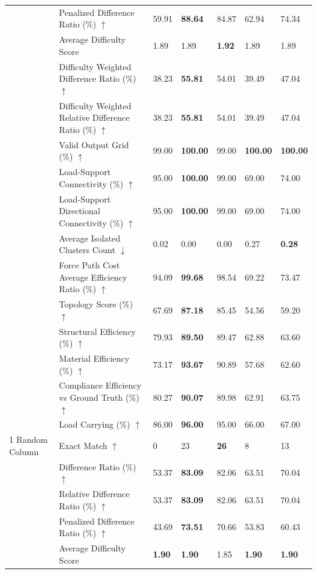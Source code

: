 \begin{table}[!h]
{\begin{tabular}{lllllll}
 & Penalized Difference Ratio (\%) $\uparrow$ & 59.91 & \textbf{88.64} & 84.87 & 62.94 & 74.34 \\
 & Average Difficulty Score & 1.89 & 1.89 & \textbf{1.92} & 1.89 & 1.89 \\
 & Difficulty Weighted Difference Ratio (\%) $\uparrow$ & 38.23 & \textbf{55.81} & 54.01 & 39.49 & 47.04 \\
 & Difficulty Weighted Relative Difference Ratio (\%) $\uparrow$ & 38.23 & \textbf{55.81} & 54.01 & 39.49 & 47.04 \\
 & Valid Output Grid (\%) $\uparrow$ & 99.00 & \textbf{100.00} & 99.00 & \textbf{100.00} & \textbf{100.00} \\
 & Load-Support Connectivity (\%) $\uparrow$ & 95.00 & \textbf{100.00} & 99.00 & 69.00 & 74.00 \\
 & Load-Support Directional Connectivity (\%) $\uparrow$ & 95.00 & \textbf{100.00} & 99.00 & 69.00 & 74.00 \\
 & Average Isolated Clusters Count $\downarrow$ & 0.02 & 0.00 & 0.00 & 0.27 & \textbf{0.28} \\
 & Force Path Cost Average Efficiency Ratio (\%) $\uparrow$ & 94.09 & \textbf{99.68} & 98.54 & 69.22 & 73.47 \\
 & Topology Score (\%) $\uparrow$ & 67.69 & \textbf{87.18} & 85.45 & 54.56 & 59.20 \\
 & Structural Efficiency (\%) $\uparrow$ & 79.93 & \textbf{89.50} & 89.47 & 62.88 & 63.60 \\
 & Material Efficiency (\%) $\uparrow$ & 73.17 & \textbf{93.67} & 90.89 & 57.68 & 62.60 \\
 & Compliance Efficiency vs Ground Truth (\%) $\uparrow$ & 80.27 & \textbf{90.07} & 89.98 & 62.91 & 63.75 \\
 & Load Carrying (\%) $\uparrow$ & 86.00 & \textbf{96.00} & 95.00 & 66.00 & 67.00 \\
1 Random Column & Exact Match $\uparrow$ & 0 & 23 & \textbf{26} & 8 & 13 \\
 & Difference Ratio (\%) $\uparrow$ & 53.37 & \textbf{83.09} & 82.06 & 63.51 & 70.04 \\
 & Relative Difference Ratio (\%) $\uparrow$ & 53.37 & \textbf{83.09} & 82.06 & 63.51 & 70.04 \\
 & Penalized Difference Ratio (\%) $\uparrow$ & 43.69 & \textbf{73.51} & 70.66 & 53.83 & 60.43 \\
 & Average Difficulty Score & \textbf{1.90} & \textbf{1.90} & 1.85 & \textbf{1.90} & \textbf{1.90} \\

\end{tabular}}
\end{table}
